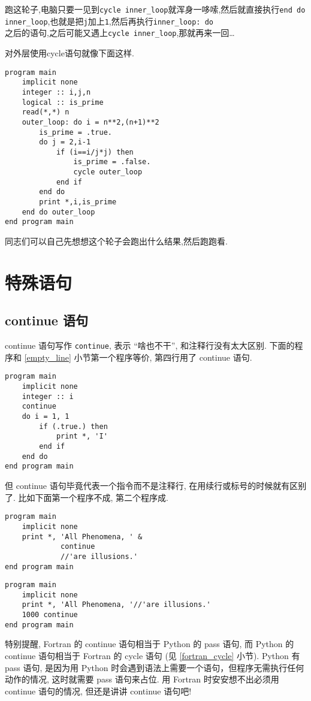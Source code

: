 跑这轮子,电脑只要一见到\texttt{cycle inner\_{}loop}就浑身一哆嗦,然后就直接执行\texttt{end do inner\_{}loop},也就是把\texttt{j}加上\texttt{1},然后再执行\texttt{inner\_{}loop: do}\\之后的语句,之后可能又遇上\texttt{cycle inner\_{}loop},那就再来一回\dots

对外层使用cycle语句就像下面这样.
\begin{lstlisting}
program main
    implicit none
    integer :: i,j,n
    logical :: is_prime
    read(*,*) n
    outer_loop: do i = n**2,(n+1)**2
        is_prime = .true.
        do j = 2,i-1
            if (i==i/j*j) then
                is_prime = .false.
                cycle outer_loop
            end if
        end do
        print *,i,is_prime
    end do outer_loop
end program main
\end{lstlisting}

同志们可以自己先想想这个轮子会跑出什么结果,然后跑跑看.

\section{特殊语句}

\subsection{continue 语句}

continue 语句写作 \texttt{continue}, 表示 ``啥也不干'', 和注释行没有太大区别. 下面的程序和 \ref{empty_line} 小节第一个程序等价, 第四行用了 continue 语句.
\begin{lstlisting}
program main
    implicit none
    integer :: i
    continue
    do i = 1, 1
        if (.true.) then
            print *, 'I'
        end if
    end do
end program main
\end{lstlisting}
但 continue 语句毕竟代表一个指令而不是注释行, 在用续行或标号的时候就有区别了. 比如下面第一个程序不成, 第二个程序成.
\begin{lstlisting}
program main
    implicit none
    print *, 'All Phenomena, ' &
             continue
             //'are illusions.'
end program main
\end{lstlisting}
\begin{lstlisting}
program main
    implicit none
    print *, 'All Phenomena, '//'are illusions.'
    1000 continue
end program main
\end{lstlisting}

特别提醒, Fortran 的 continue 语句相当于 Python 的 pass 语句, 而 Python 的 continue 语句相当于 Fortran 的 cycle 语句 (见 \ref{fortran_cycle} 小节). Python 有 pass 语句, 是因为用 Python 时会遇到语法上需要一个语句，但程序无需执行任何动作的情况, 这时就需要 pass 语句来占位. 用 Fortran 时安安想不出必须用 continue 语句的情况, 但还是讲讲 continue 语句吧!

